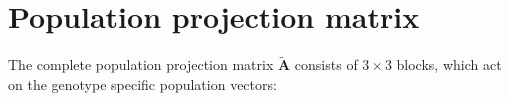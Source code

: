\documentclass[11pt]{article}
\def\mbf#1{\mathbf{#1}}
\begin{document}
%
%
%
%
%
\renewcommand\thesection{Appendix~\Alph{section}}
\renewcommand\thesubsection{\Alph{section}.\arabic{subsection}}


\section{Population projection matrix}\label{App:Projection}
\renewcommand{\theequation}{A\arabic{equation}}
\setcounter{equation}{0}  %
\setcounter{table}{0}  %

The complete population projection matrix $\tilde{\mbf{A}}$ consists of $3 \times 3$ blocks, which act on the genotype specific population vectors:
\end{document}

